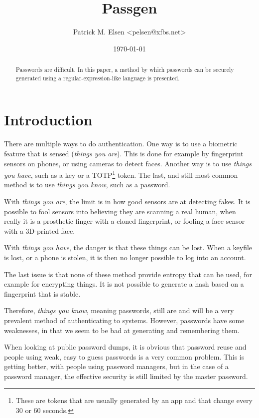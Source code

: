 \documentclass[a4paper]{article}
\title{Passgen}
\author{Patrick M. Elsen <pelsen@xfbs.net>}
\date{\today}
\begin{document}
\maketitle
\begin{abstract}
  Passwords are difficult. In this paper, a method by which passwords can be securely generated using a regular-expression-like language is presented.
\end{abstract}

\tableofcontents

\section{Introduction}

There are multiple ways to do authentication. One way is to use a biometric feature that is sensed (\emph{things you are}). This is done for example by fingerprint sensors on phones, or using cameras to detect faces. Another way is to use \emph{things you have}, such as a key or a TOTP\footnote{These are tokens that are usually generated by an app and that change every 30 or 60 seconds.} token. The last, and still most common method is to use \emph{things you know}, such as a password.

With \emph{things you are}, the limit is in how good sensors are at detecting fakes. It is possible to fool sensors into believing they are scanning a real human, when really it is a prosthetic finger with a cloned fingerprint, or fooling a face sensor with a 3D-printed face.

With \emph{things you have}, the danger is that these things can be lost. When a keyfile is lost, or a phone is stolen, it is then no longer possible to log into an account.

The last issue is that none of these method provide entropy that can be used, for example for encrypting things. It is not possible to generate a hash based on a fingerprint that is stable. 

Therefore, \emph{things you know}, meaning passwords, still are and will be a very prevalent method of authenticating to systems. However, passwords have some weaknesses, in that we seem to be bad at generating and remembering them.

When looking at public password dumps, it is obvious that password reuse and people using weak, easy to guess passwords is a very common problem. This is getting better, with people using password managers, but in the case of a password manager, the effective security is still limited by the master password.
\end{document}
